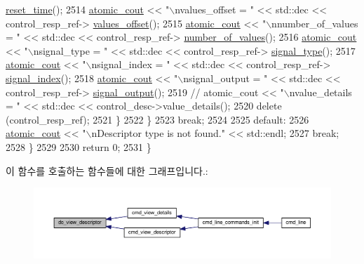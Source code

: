 \begin{DoxyCode}
      \hyperlink{classavdecc__lib_1_1control__descriptor__response_a965f28f8ade94bc7af4563a05dcd0b79}{reset\_time}();
2514             \hyperlink{cmd__line_8h_a0bc38ccc65c79ba06c6fcd7b4bf554c3}{atomic\_cout} << \textcolor{stringliteral}{"\(\backslash\)nvalues\_offset = "} << std::dec << control\_resp\_ref->
      \hyperlink{classavdecc__lib_1_1control__descriptor__response_a4b716c566acc218087385fb85f07272e}{values\_offset}();
2515             \hyperlink{cmd__line_8h_a0bc38ccc65c79ba06c6fcd7b4bf554c3}{atomic\_cout} << \textcolor{stringliteral}{"\(\backslash\)nnumber\_of\_values = "} << std::dec << control\_resp\_ref->
      \hyperlink{classavdecc__lib_1_1control__descriptor__response_a3e66dc5ce2002e40973bbfd7e8d6b51e}{number\_of\_values}();
2516             \hyperlink{cmd__line_8h_a0bc38ccc65c79ba06c6fcd7b4bf554c3}{atomic\_cout} << \textcolor{stringliteral}{"\(\backslash\)nsignal\_type = "} << std::dec << control\_resp\_ref->
      \hyperlink{classavdecc__lib_1_1control__descriptor__response_ac204637e5ecfc30b4cc47c0d78d81ce1}{signal\_type}();
2517             \hyperlink{cmd__line_8h_a0bc38ccc65c79ba06c6fcd7b4bf554c3}{atomic\_cout} << \textcolor{stringliteral}{"\(\backslash\)nsignal\_index = "} << std::dec << control\_resp\_ref->
      \hyperlink{classavdecc__lib_1_1control__descriptor__response_aa1d83268f9a492f864d3e213acf71a97}{signal\_index}();
2518             \hyperlink{cmd__line_8h_a0bc38ccc65c79ba06c6fcd7b4bf554c3}{atomic\_cout} << \textcolor{stringliteral}{"\(\backslash\)nsignal\_output = "} << std::dec << control\_resp\_ref->
      \hyperlink{classavdecc__lib_1_1control__descriptor__response_a729bc59f434e7de353db02db35977dfa}{signal\_output}();
2519             \textcolor{comment}{// atomic\_cout << "\(\backslash\)nvalue\_details = " << std::dec << control\_desc->value\_details();}
2520             \textcolor{keyword}{delete} (control\_resp\_ref);
2521         \}
2522     \}
2523     \textcolor{keywordflow}{break};
2524 
2525     \textcolor{keywordflow}{default}:
2526         \hyperlink{cmd__line_8h_a0bc38ccc65c79ba06c6fcd7b4bf554c3}{atomic\_cout} << \textcolor{stringliteral}{"\(\backslash\)nDescriptor type is not found."} << std::endl;
2527         \textcolor{keywordflow}{break};
2528     \}
2529 
2530     \textcolor{keywordflow}{return} 0;
2531 \}
\end{DoxyCode}


이 함수를 호출하는 함수들에 대한 그래프입니다.\+:
\nopagebreak
\begin{figure}[H]
\begin{center}
\leavevmode
\includegraphics[width=350pt]{classcmd__line_aef7d9f8c4eff85c46e5b7aea0961bb51_icgraph}
\end{center}
\end{figure}



